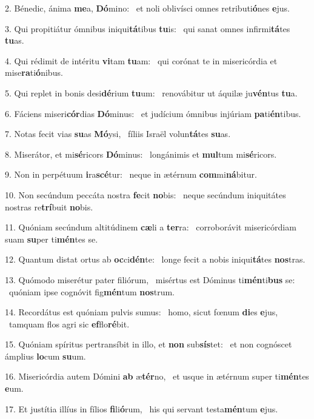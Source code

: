 2. Bénedic, ánima \textbf{me}a, \textbf{Dó}mino: \ast\  et noli oblivísci omnes retributi\textbf{ó}nes \textbf{e}jus.\

3. Qui propitiátur ómnibus iniqui\textbf{tá}tibus \textbf{tu}is: \ast\  qui sanat omnes infirmi\textbf{tá}tes \textbf{tu}as.\

4. Qui rédimit de intéritu \textbf{vi}tam \textbf{tu}am: \ast\  qui corónat te in misericórdia et mise\textbf{ra}ti\textbf{ó}nibus.\

5. Qui replet in bonis desi\textbf{dé}rium \textbf{tu}um: \ast\  renovábitur ut áquilæ ju\textbf{vén}tus \textbf{tu}a.\

6. Fáciens miseri\textbf{cór}dias \textbf{Dó}minus: \ast\  et judícium ómnibus injúriam \textbf{pa}ti\textbf{én}tibus.\

7. Notas fecit vias \textbf{su}as \textbf{Mó}ysi, \ast\  fíliis Israël volun\textbf{tá}tes \textbf{su}as.\

8. Miserátor, et mi\textbf{sé}ricors \textbf{Dó}minus: \ast\  longánimis et \textbf{mul}tum mi\textbf{sé}ricors.\

9. Non in perpétuum \textbf{i}ra\textbf{scé}tur: \ast\  neque in ætérnum \textbf{com}mi\textbf{ná}bitur.\

10. Non secúndum peccáta nostra \textbf{fe}cit \textbf{no}bis: \ast\  neque secúndum iniquitátes nostras re\textbf{trí}buit \textbf{no}bis.\

11. Quóniam secúndum altitúdinem \textbf{cæ}li a \textbf{ter}ra: \ast\  corroborávit misericórdiam suam \textbf{su}per ti\textbf{mén}tes se.\

12. Quantum distat ortus ab \textbf{oc}ci\textbf{dén}te: \ast\  longe fecit a nobis iniqui\textbf{tá}tes \textbf{nos}tras.\

13. Quómodo miserétur pater filiórum, \dag\  misértus est Dóminus ti\textbf{mén}ti\textbf{bus} se: \ast\  quóniam ipse cognóvit fig\textbf{mén}tum \textbf{nos}trum.\

14. Recordátus est quóniam pulvis sumus: \dag\  homo, sicut fœnum \textbf{di}es \textbf{e}jus, \ast\  tamquam flos agri sic \textbf{ef}flo\textbf{ré}bit.\

15. Quóniam spíritus pertransíbit in illo, et \textbf{non} sub\textbf{sís}tet: \ast\  et non cognóscet ámplius \textbf{lo}cum \textbf{su}um.\

16. Misericórdia autem Dómini \textbf{ab} æ\textbf{tér}no, \ast\  et usque in ætérnum super ti\textbf{mén}tes \textbf{e}um.\

17. Et justítia illíus in fílios \textbf{fi}li\textbf{ó}rum, \ast\  his qui servant testa\textbf{mén}tum \textbf{e}jus.\

